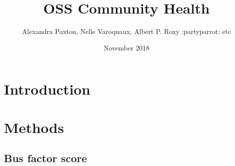\documentclass{article}
\title{OSS Community Health}
\author{Alexandra Paxton, Nelle Varoquaux, Albert P. Roxy :partyparrot: etc}
\date{November 2018}
\begin{document}
\begin{abstract}

\end{abstract}

\maketitle

\section{Introduction}

\section{Methods}

\subsection{Bus factor score}
\end{document}
